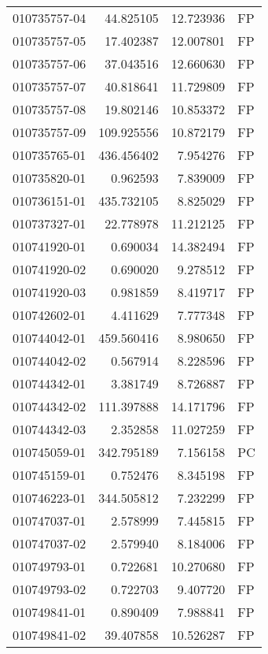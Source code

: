 \begin{tabular}{lrrl}
010735757-04 &   44.825105 &      12.723936 &   FP \\
010735757-05 &   17.402387 &      12.007801 &   FP \\
010735757-06 &   37.043516 &      12.660630 &   FP \\
010735757-07 &   40.818641 &      11.729809 &   FP \\
010735757-08 &   19.802146 &      10.853372 &   FP \\
010735757-09 &  109.925556 &      10.872179 &   FP \\
010735765-01 &  436.456402 &       7.954276 &   FP \\
010735820-01 &    0.962593 &       7.839009 &   FP \\
010736151-01 &  435.732105 &       8.825029 &   FP \\
010737327-01 &   22.778978 &      11.212125 &   FP \\
010741920-01 &    0.690034 &      14.382494 &   FP \\
010741920-02 &    0.690020 &       9.278512 &   FP \\
010741920-03 &    0.981859 &       8.419717 &   FP \\
010742602-01 &    4.411629 &       7.777348 &   FP \\
010744042-01 &  459.560416 &       8.980650 &   FP \\
010744042-02 &    0.567914 &       8.228596 &   FP \\
010744342-01 &    3.381749 &       8.726887 &   FP \\
010744342-02 &  111.397888 &      14.171796 &   FP \\
010744342-03 &    2.352858 &      11.027259 &   FP \\
010745059-01 &  342.795189 &       7.156158 &   PC \\
010745159-01 &    0.752476 &       8.345198 &   FP \\
010746223-01 &  344.505812 &       7.232299 &   FP \\
010747037-01 &    2.578999 &       7.445815 &   FP \\
010747037-02 &    2.579940 &       8.184006 &   FP \\
010749793-01 &    0.722681 &      10.270680 &   FP \\
010749793-02 &    0.722703 &       9.407720 &   FP \\
010749841-01 &    0.890409 &       7.988841 &   FP \\
010749841-02 &   39.407858 &      10.526287 &   FP \\

\end{tabular}
